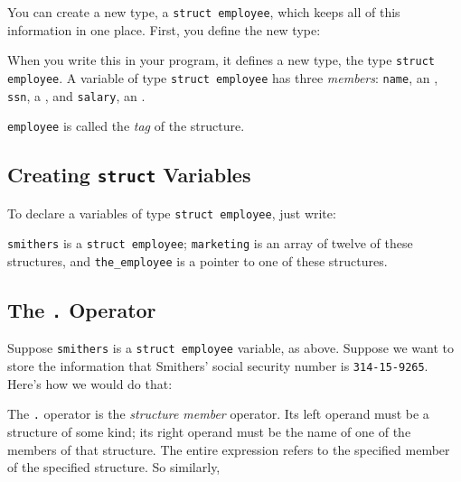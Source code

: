 You can create a new type, a {\tt struct employee}, which keeps all of
this information in one place.  First, you define the new type:

\begin{flushleft}
\verb% struct employee {% \\*
\verb%   char name[51];% \\*
\verb%   long int ssn;% \\*
\verb%   int salary;% \\*
\verb%} ; % 
\end{flushleft}

When you write this in your program, it defines a new type, the type
{\tt struct employee}.  A variable of type {\tt struct employee} has
three {\em members}\/:  {\tt name}, an , {\tt ssn}, a
\longint, and {\tt salary}, an \int.  

{\tt employee} is called the {\em tag}\/ of the structure.

\subsection{Creating {\tt struct} Variables}

To declare a variables of type {\tt struct employee}, just write:

\begin{flushleft}
\verb% struct employee smithers, marketing[12], *the_employee;% 
\end{flushleft}

{\tt smithers} is a {\tt struct employee}; {\tt marketing} is an array
of twelve of these structures, and {\tt the\_employee} is a pointer to
one of these structures.

\subsection{The {\tt .} Operator}

Suppose {\tt smithers} is a {\tt struct employee} variable, as above.
Suppose we want to store the information that Smithers' social security
number is {\tt 314-15-9265}.  Here's how we would do that:

\begin{flushleft}
\verb% smithers.ssn = 314159265; %
\end{flushleft}

The {\tt .} operator is the {\em structure member}\/ operator.  Its left
operand must be a structure of some kind; its right operand must be the
name of one of the members of that structure.  The entire expression
refers to the specified member of the specified structure.  So
similarly,

